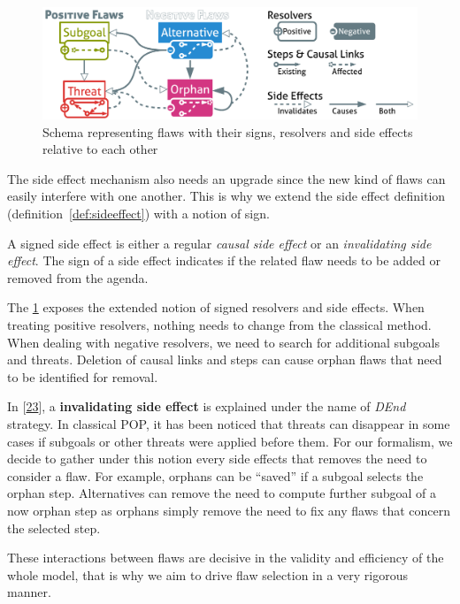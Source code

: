 \begin{figure}[htbp]
\centering
\includegraphics{graphics/sideeffects.pdf}
\caption{\label{fig:sideeffects}Schema representing flaws with their
signs, resolvers and side effects relative to each other}
\end{figure}

The side effect mechanism also needs an upgrade since the new kind of
flaws can easily interfere with one another. This is why we extend the
side effect definition (definition~\ref{def:sideeffect}) with a notion
of sign.

\begin{definition}

A signed side effect is either a regular \emph{causal side effect} or an
\emph{invalidating side effect}. The sign of a side effect indicates if
the related flaw needs to be added or removed from the agenda.

\end{definition}

The \cref{fig:sideeffects} exposes the extended notion of signed
resolvers and side effects. When treating positive resolvers, nothing
needs to change from the classical method. When dealing with negative
resolvers, we need to search for additional subgoals and threats.
Deletion of causal links and steps can cause orphan flaws that need to
be identified for removal.

In {[}\protect\hyperlink{ref-peotux5fthreatremovalux5f1993}{23}{]}, a
\textbf{invalidating side effect} is explained under the name of
\emph{DEnd} strategy. In classical POP, it has been noticed that threats
can disappear in some cases if subgoals or other threats were applied
before them. For our formalism, we decide to gather under this notion
every side effects that removes the need to consider a flaw. For
example, orphans can be ``saved'' if a subgoal selects the orphan step.
Alternatives can remove the need to compute further subgoal of a now
orphan step as orphans simply remove the need to fix any flaws that
concern the selected step.

These interactions between flaws are decisive in the validity and
efficiency of the whole model, that is why we aim to drive flaw
selection in a very rigorous manner.

